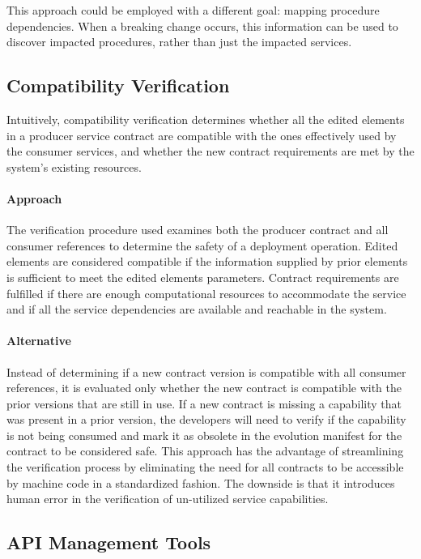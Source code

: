 This approach could be employed with a different goal: mapping procedure dependencies.
When a breaking change occurs, this information can be used to discover impacted procedures, rather than just the impacted services.

\subsection{Compatibility Verification} %
\label{sec:compatibility_verification_design}

Intuitively, compatibility verification determines whether
all the edited elements in a producer service contract are compatible with the ones effectively
used by the consumer services, and whether the new contract requirements are met
by the system’s existing resources.

\paragraph{Approach}
The verification procedure used examines both the producer contract and all consumer references to determine the safety of a deployment operation.
Edited elements are considered compatible if the information supplied by prior elements is sufficient to meet the edited elements parameters.
Contract requirements are fulfilled if there are enough computational resources to accommodate the service and if all the
service dependencies are available and reachable in the system.

\paragraph{Alternative}
Instead of determining if a new contract version is compatible with all consumer references,
it is evaluated only whether the new contract is compatible with the prior versions that are still in use.
If a new contract is missing a capability that was present in a prior version,
the developers will need to verify if the capability is not being consumed
and mark it as obsolete in the evolution manifest for the contract to be considered safe.
This approach has the advantage of streamlining the verification process by eliminating the
need for all contracts to be accessible by machine code in a standardized fashion.
The downside is that it introduces human error in the verification of un-utilized service capabilities.

\subsection{API Management Tools} %
\label{sec:tools}

